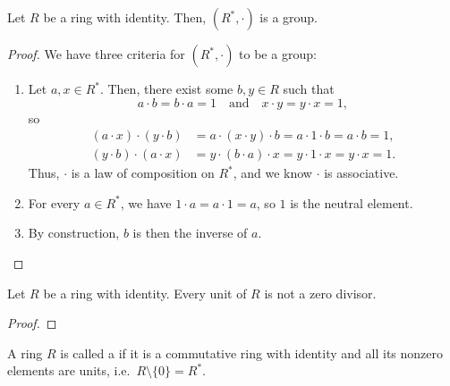 \begin{prop}
Let $ R $ be a ring with identity. Then, $ (R^*,\cdot) $ is a group.
\end{prop}
\begin{proof}
We have three criteria for $ (R^*,\cdot) $ to be a group:
\begin{enumerate}
    \item Let $ a,x\in R^* $. Then, there exist some $ b,y\in R $ such that
    \begin{equation*}
        a\cdot b=b\cdot a=1 \quad\text{and}\quad x\cdot y=y\cdot x=1,
    \end{equation*}
    so
    \begin{align*}
        (a\cdot x)\cdot(y\cdot b) &= a\cdot(x\cdot y)\cdot b=a\cdot 1\cdot b=a\cdot b=1, \\
            (y\cdot b)\cdot(a\cdot x) &= y\cdot(b\cdot a)\cdot x=y\cdot 1\cdot x=y\cdot x=1.
    \end{align*}
    Thus, $ \cdot $ is a law of composition on $ R^* $, and we know $ \cdot $ is associative.

    \item For every $ a\in R^* $, we have $ 1\cdot a=a\cdot 1=a $, so $ 1 $ is the neutral element.
    
    \item By construction, $ b $ is then the inverse of $ a $.\qedhere
\end{enumerate}
\end{proof}

\begin{prop}
Let $ R $ be a ring with identity. Every unit of $ R $ is not a zero divisor.
\end{prop}
\begin{proof}
\end{proof}

\begin{defn}
A ring $ R $ is called a  if it is a commutative ring with identity and all its nonzero elements are units, i.e.\ $ R\setminus\{0\}=R^* $.
\end{defn}

